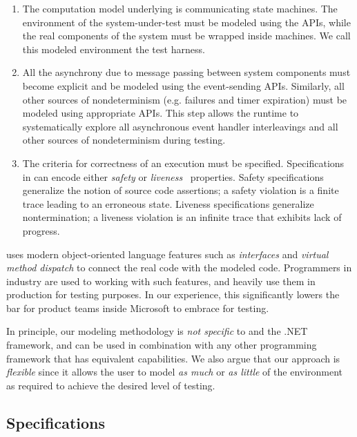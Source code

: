 \begin{enumerate}
\item
The computation model underlying \psharp is communicating state machines. The environment of the system-under-test must be modeled using the \psharp APIs, while the real components of the system must be wrapped inside \psharp machines. We call this modeled environment the \psharp test harness.

\item
All the asynchrony due to message passing between system components must become explicit and be modeled using the \psharp event-sending APIs. Similarly, all other sources of nondeterminism (e.g. failures and timer expiration) must be modeled using appropriate \psharp APIs. This step allows the \psharp runtime to systematically explore all asynchronous event handler interleavings and all other sources of nondeterminism during testing.

\item
The criteria for correctness of an execution must be specified. Specifications in \psharp can encode either \emph{safety} or \emph{liveness}~\cite{lamport1977proving} properties. Safety specifications generalize the notion of source code assertions; a safety violation is a finite trace leading to an erroneous state. Liveness specifications generalize nontermination; a liveness violation is an infinite trace that exhibits lack of progress.
\end{enumerate}

\noindent
\psharp uses modern object-oriented language features such as \emph{interfaces} and \emph{virtual method dispatch} to connect the real code with the modeled code. Programmers in industry are used to working with such features, and heavily use them in production for testing purposes. In our experience, this significantly lowers the bar for product teams inside Microsoft to embrace \psharp for testing.

In principle, our modeling methodology is \emph{not specific} to \psharp and the .NET framework, and can be used in combination with any other programming framework that has equivalent capabilities. We also argue that our approach is \emph{flexible} since it allows the user to model \emph{as much} or \emph{as little} of the environment as required to achieve the desired level of testing.

\subsection{Specifications}
\label{sec:bg:bugs}

